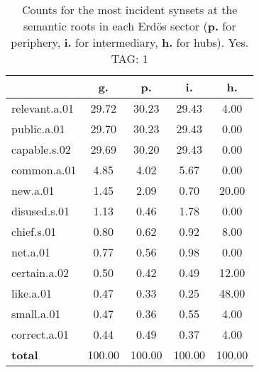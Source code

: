 \begin{table}[h!]
\begin{center}
\begin{tabular}{| l || c | c | c | c |}\hline
 & {\bf g.} & {\bf p.} & {\bf i.} & {\bf h.} \\\hline\hline
relevant.a.01 & 29.72  & 30.23  & 29.43  & 4.00 \\\hline
public.a.01 & 29.70  & 30.23  & 29.43  & 0.00 \\\hline
capable.s.02 & 29.69  & 30.20  & 29.43  & 0.00 \\\hline
common.a.01 & 4.85  & 4.02  & 5.67  & 0.00 \\\hline
new.a.01 & 1.45  & 2.09  & 0.70  & 20.00 \\\hline
disused.s.01 & 1.13  & 0.46  & 1.78  & 0.00 \\\hline
chief.s.01 & 0.80  & 0.62  & 0.92  & 8.00 \\\hline
net.a.01 & 0.77  & 0.56  & 0.98  & 0.00 \\\hline
certain.a.02 & 0.50  & 0.42  & 0.49  & 12.00 \\\hline
like.a.01 & 0.47  & 0.33  & 0.25  & 48.00 \\\hline
small.a.01 & 0.47  & 0.36  & 0.55  & 4.00 \\\hline
correct.a.01 & 0.44  & 0.49  & 0.37  & 4.00 \\\hline\hline
{{\bf total}} & 100.00  & 100.00  & 100.00  & 100.00 \\\hline
\end{tabular}
\caption{Counts for the most incident synsets at the semantic roots in each Erd\"os sector ({\bf p.} for periphery, {\bf i.} for intermediary, {\bf h.} for hubs). Yes. TAG: 1}
\end{center}
\end{table}